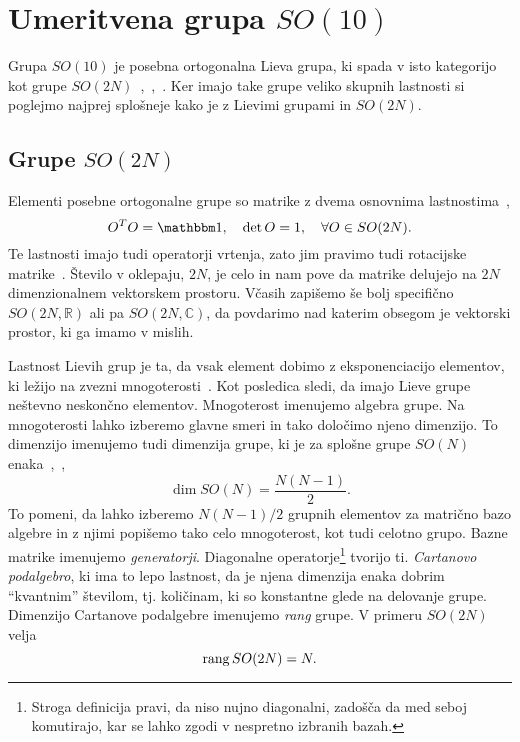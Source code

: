 \chapter{Umeritvena grupa $SO(10)$}

Grupa $SO(10)$ je posebna ortogonalna Lieva grupa, ki spada v isto kategorijo kot grupe
$SO(2N)$~\cite{mohapatra},~\cite{compact},~\cite{oezer}. Ker imajo take grupe veliko skupnih lastnosti
si poglejmo najprej splošneje kako je z Lievimi grupami in $SO(2N)$.

\section{Grupe $SO(2N)$}

Elementi posebne ortogonalne grupe so matrike z dvema osnovnima lastnostima~\cite{compact},
\begin{equation}
	O^TO = \one, \quad \det O = 1, \quad \forall O \in SO(2N).
\end{equation}
Te lastnosti imajo tudi operatorji vrtenja, zato jim pravimo tudi rotacijske matrike~\cite{compact}.
Število v oklepaju, $2N$, je celo in nam pove da matrike delujejo na $2N$ dimenzionalnem vektorskem
prostoru. Včasih zapišemo še bolj specifično $SO(2N, \mathbb{R})$ ali pa $SO(2N, \mathbb{C})$, da povdarimo
nad katerim obsegom je vektorski prostor, ki ga imamo v mislih.

Lastnost Lievih grup je ta, da vsak element dobimo z eksponenciacijo elementov, ki ležijo na
zvezni mnogoterosti~\cite{compact}. Kot posledica sledi, da imajo Lieve grupe neštevno neskončno
elementov. Mnogoterost imenujemo algebra grupe. Na mnogoterosti lahko izberemo glavne smeri in tako
določimo njeno dimenzijo. To dimenzijo imenujemo tudi dimenzija grupe, ki je za splošne grupe
$SO(N)$ enaka~\cite{mohapatra},~\cite{compact},
\begin{equation}
	\dim SO(N) = \frac{N(N - 1)}{2}.
\end{equation}
To pomeni, da lahko izberemo $N(N-1)/2$ grupnih elementov za matrično bazo algebre in z njimi
popišemo tako celo mnogoterost, kot tudi celotno grupo. Bazne matrike imenujemo \emph{generatorji}.
Diagonalne operatorje\footnote{Stroga definicija pravi, da niso nujno diagonalni, zadošča da med
seboj komutirajo, kar se lahko zgodi v nespretno izbranih bazah.} tvorijo ti.
\emph{Cartanovo podalgebro}, ki ima to lepo lastnost, da je njena dimenzija enaka dobrim
"`kvantnim"' številom, tj. količinam, ki so konstantne glede na delovanje grupe. Dimenzijo
Cartanove podalgebre imenujemo \emph{rang} grupe. V primeru $SO(2N)$ velja~\cite{compact}
\begin{equation}
	\operatorname{rang} SO(2N) = N.
\end{equation}

